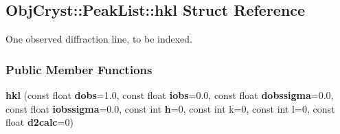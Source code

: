 \subsection{ObjCryst::PeakList::hkl Struct Reference}
\label{a00035}


One observed diffraction line, to be indexed.  
\subsubsection*{Public Member Functions}
\begin{DoxyCompactItemize}
\item 
{\bfseries hkl} (const float {\bf dobs}=1.0, const float {\bf iobs}=0.0, const float {\bf dobssigma}=0.0, const float {\bf iobssigma}=0.0, const int {\bf h}=0, const int k=0, const int l=0, const float {\bf d2calc}=0)\label{a00035_a8c23626fff887e4eae3941b76dfa39e6}

\end{DoxyCompactItemize}
